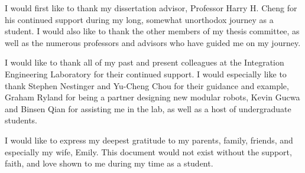 
\begin{acknowledgements}

I would first like to thank my dissertation advisor, Professor Harry H.
Cheng for his continued support during my long, somewhat unorthodox journey
as a student. I would also like to thank the other members of my thesis committee,
as well as the numerous professors and advisors who have guided me on my 
journey.

I would like to thank all of my past and present colleagues at the Integration
Engineering Laboratory for their continued support. I would especially like
to thank Stephen Nestinger and Yu-Cheng Chou for their guidance and example, 
Graham Ryland for being a partner designing new modular robots, Kevin Gucwa and
Binsen Qian for assisting me in the lab, as well as a host of undergraduate students.

I would like to express my deepest gratitude to my parents, family, friends,
and especially my wife, Emily. This document would not exist without the 
support, faith, and love shown to me during my time as a student.

\begin{comment}
I am deeply indebted to my dissertation advisor, Professor Harry H. Cheng for his 
  continued support, encouragement, and invaluable supervision during my 
  graduate studies for the doctorate degree.
I would also like to thank the other members of my thesis committee, Professor 
  Bahram Ravani and Professor Sanjay Joshi for their support and advice during 
  the course of this research project. 
They have been very helpful in discussing design issues related to the project.

I would like to thank all of my colleagues at the Integration Engineering 
   Laboratory for their companionship and continued support during difficult
   times.
In particular, I would like to thank Yu-Cheng Chou for his motivational 
  diligence and hard work, Graham Ryland and David Ko for times spent working 
  on and discussing robotics, and Bo Chen for her strength and dedication which
  helped make this research possible.

I would like to thank the Sandia National Laboratories for providing me with
  the Sandia National Laboratory/UC Davis Excellence in Engineering Graduate 
  Fellowship for my Ph.D. studies.

I would like to express my sincerest appreciation to my parents for their 
  continued support and encouragement, without whom none of this would have
  been possible.
A big thanks to my other family members and all of my close friends for 
  believing in me, supporting me, and encouraging me to do my best. 
\end{comment}

\end{acknowledgements}

